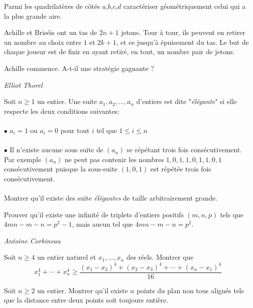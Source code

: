 \begin{exo}{}
Parmi les quadrilatères de côtés
$a$,$b$,$c$,$d$ caractériser géométriquement celui qui a la plus
grande aire.
\end{exo}

\begin{exo}{ }
Achille et Briséis ont un tas de $2n+1$ jetons. Tour à tour, ils peuvent en retirer un nombre au choix entre $1$ et $2k+1$, et ce jusqu'à épuisement du tas. Le but de chaque joueur est de finir en ayant retiré, en tout,
un nombre pair de jetons.

Achille commence. A-t-il une stratégie gagnante ?

\medskip
\textit{Elliot Thorel}
\end{exo}

\begin{exo}{}
Soit $n\ge 1$ un entier. Une suite $a_1,a_2,...,a_n$ d'entiers est dite "\textit{élégante}" si elle respecte les deux conditions suivantes:\\~~\\
$\bullet$ $a_i=1$ ou $a_i=0$ pour tout $i$ tel que $1\le i\le n$\\~~\\
$\bullet$ Il n'existe aucune sous suite de $(a_n)$ se répétant trois fois consécutivement. Par exemple $(a_n)$ ne peut pas contenir les nombres $1,0,1,1,0,1,1,0,1$  consécutivement puisque la sous-suite $(1,0,1)$ est répétée trois fois consécutivement. \\~~\\
Montrer qu'il existe des suite \textit{élégantes} de taille arbitrairement grande.

\end{exo}

\begin{exo}{}
Prouver qu'il existe une infinité de triplets d'entiers positifs $(m,n,p)$ tels que $4mn-m-n=p^2-1$, mais aucun tel que $4mn-m-n=p^2$.

\medskip
\textit{Antoine Corbineau}
\end{exo}

\begin{exo}{}
Soit $n \geq 4$ un entier naturel et $x_1, \dots, x_n$ des réels. Montrer que
$$x_1^4+\cdots+x_n^4 \geq \dfrac{(x_1-x_2)^4+(x_2-x_3)^4+ \cdots +(x_n-x_1)^4}{16}$$\end{exo}


\begin{exo}{}
Soit $n\ge 2$ un entier. Montrer qu'il existe $n$ points du plan non tous alignés tels que la distance entre deux points soit toujours entière.
\end{exo}

